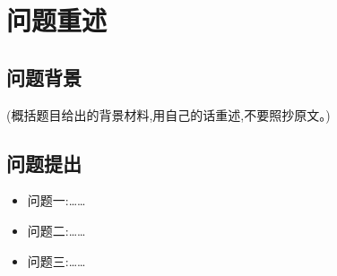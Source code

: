 \section{问题重述}

\subsection{问题背景}

(概括题目给出的背景材料,用自己的话重述,不要照抄原文。)

\subsection{问题提出}

\begin{itemize}
  \item 问题一:……
  \item 问题二:……
  \item 问题三:……
\end{itemize}
